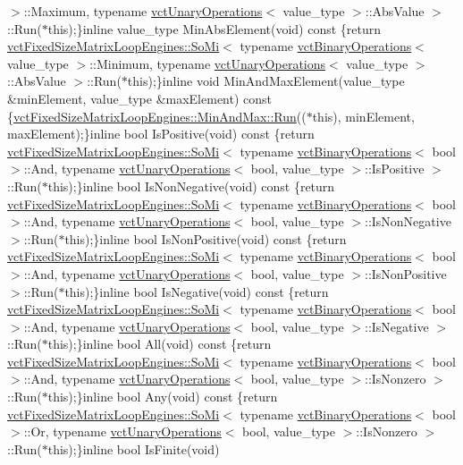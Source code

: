 \begin{DoxyCompactItemize}
$>$\+::Maximum, typename \hyperlink{classvct_unary_operations}{vct\+Unary\+Operations}$<$ value\+\_\+type $>$\+::Abs\+Value $>$\+::Run($\ast$this);\}inline value\+\_\+type Min\+Abs\+Element(void) const \{return \hyperlink{classvct_fixed_size_matrix_loop_engines_1_1_so_mi}{vct\+Fixed\+Size\+Matrix\+Loop\+Engines\+::\+So\+Mi}$<$ typename \hyperlink{classvct_binary_operations}{vct\+Binary\+Operations}$<$ value\+\_\+type $>$\+::Minimum, typename \hyperlink{classvct_unary_operations}{vct\+Unary\+Operations}$<$ value\+\_\+type $>$\+::Abs\+Value $>$\+::Run($\ast$this);\}inline void Min\+And\+Max\+Element(value\+\_\+type \&min\+Element, value\+\_\+type \&max\+Element) const \{\hyperlink{classvct_fixed_size_matrix_loop_engines_1_1_min_and_max_ac741cdb4fecf6e19498d59b7d9ee6354}{vct\+Fixed\+Size\+Matrix\+Loop\+Engines\+::\+Min\+And\+Max\+::\+Run}(($\ast$this), min\+Element, max\+Element);\}inline bool Is\+Positive(void) const \{return \hyperlink{classvct_fixed_size_matrix_loop_engines_1_1_so_mi}{vct\+Fixed\+Size\+Matrix\+Loop\+Engines\+::\+So\+Mi}$<$ typename \hyperlink{classvct_binary_operations}{vct\+Binary\+Operations}$<$ bool $>$\+::And, typename \hyperlink{classvct_unary_operations}{vct\+Unary\+Operations}$<$ bool, value\+\_\+type $>$\+::Is\+Positive $>$\+::Run($\ast$this);\}inline bool Is\+Non\+Negative(void) const \{return \hyperlink{classvct_fixed_size_matrix_loop_engines_1_1_so_mi}{vct\+Fixed\+Size\+Matrix\+Loop\+Engines\+::\+So\+Mi}$<$ typename \hyperlink{classvct_binary_operations}{vct\+Binary\+Operations}$<$ bool $>$\+::And, typename \hyperlink{classvct_unary_operations}{vct\+Unary\+Operations}$<$ bool, value\+\_\+type $>$\+::Is\+Non\+Negative $>$\+::Run($\ast$this);\}inline bool Is\+Non\+Positive(void) const \{return \hyperlink{classvct_fixed_size_matrix_loop_engines_1_1_so_mi}{vct\+Fixed\+Size\+Matrix\+Loop\+Engines\+::\+So\+Mi}$<$ typename \hyperlink{classvct_binary_operations}{vct\+Binary\+Operations}$<$ bool $>$\+::And, typename \hyperlink{classvct_unary_operations}{vct\+Unary\+Operations}$<$ bool, value\+\_\+type $>$\+::Is\+Non\+Positive $>$\+::Run($\ast$this);\}inline bool Is\+Negative(void) const \{return \hyperlink{classvct_fixed_size_matrix_loop_engines_1_1_so_mi}{vct\+Fixed\+Size\+Matrix\+Loop\+Engines\+::\+So\+Mi}$<$ typename \hyperlink{classvct_binary_operations}{vct\+Binary\+Operations}$<$ bool $>$\+::And, typename \hyperlink{classvct_unary_operations}{vct\+Unary\+Operations}$<$ bool, value\+\_\+type $>$\+::Is\+Negative $>$\+::Run($\ast$this);\}inline bool All(void) const \{return \hyperlink{classvct_fixed_size_matrix_loop_engines_1_1_so_mi}{vct\+Fixed\+Size\+Matrix\+Loop\+Engines\+::\+So\+Mi}$<$ typename \hyperlink{classvct_binary_operations}{vct\+Binary\+Operations}$<$ bool $>$\+::And, typename \hyperlink{classvct_unary_operations}{vct\+Unary\+Operations}$<$ bool, value\+\_\+type $>$\+::Is\+Nonzero $>$\+::Run($\ast$this);\}inline bool Any(void) const \{return \hyperlink{classvct_fixed_size_matrix_loop_engines_1_1_so_mi}{vct\+Fixed\+Size\+Matrix\+Loop\+Engines\+::\+So\+Mi}$<$ typename \hyperlink{classvct_binary_operations}{vct\+Binary\+Operations}$<$ bool $>$\+::Or, typename \hyperlink{classvct_unary_operations}{vct\+Unary\+Operations}$<$ bool, value\+\_\+type $>$\+::Is\+Nonzero $>$\+::Run($\ast$this);\}inline bool Is\+Finite(void) 
\end{DoxyCompactItemize}
